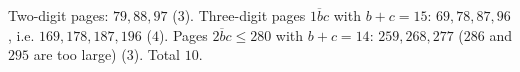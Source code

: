 Two-digit pages: $79,88,97$ ($3$). Three-digit pages $\overline{1bc}$ with $b+c=15$: $69,78,87,96$, i.e. $169,178,187,196$ ($4$). Pages $\overline{2bc}\le280$ with $b+c=14$: $259,268,277$ ($286$ and $295$ are too large) ($3$). Total $\boxed{10}$.
